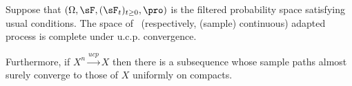



\begin{theorem}\label{thm:complete_cadlag_continuous_under_ucp_convergence}
Suppose that $(\Omega,\sF,(\sF_t)_{t\geq 0}, \pro)$ is the filtered probability space satisfying usual conditions. The space of \cadlag\ (respectively, (sample) continuous) adapted process is complete under u.c.p. convergence.

Furthermore, if $X^n \xrightarrow{ucp} X$ then there is a subsequence whose sample paths almost surely converge to those of $X$ uniformly on compacts.
\end{theorem}


